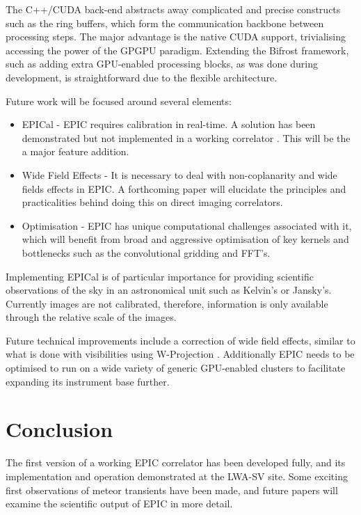 \documentclass[bibliography=totocnumbered, twocolumn]{article}
\begin{document}
The C++/CUDA back-end abstracts away complicated and precise constructs
such as the ring buffers, which form the communication backbone between
processing steps. The major advantage is the native CUDA support,
trivialising accessing the power of the GPGPU paradigm. Extending the 
Bifrost framework, such as adding extra GPU-enabled processing blocks, as
was done during development, is straightforward due to the flexible
architecture.

Future work will be focused around several elements:

\begin{itemize}
\item EPICal - EPIC requires calibration in real-time. A solution has been demonstrated but not implemented in a working correlator \citep{beardsley_efficient_2017}. This will be the a major feature addition.
\item Wide Field Effects - It is necessary to deal with non-coplanarity and wide fields effects in EPIC. A forthcoming paper will elucidate the principles and practicalities behind doing this on direct imaging correlators.
\item Optimisation - EPIC has unique computational challenges associated with it, which will benefit from broad and aggressive optimisation of key kernels and bottlenecks such as the convolutional gridding and FFT's.
\end{itemize}

Implementing EPICal is of particular importance for providing scientific
observations of the sky in an astronomical unit such as Kelvin's
or Jansky's. Currently images are not calibrated, therefore, information
is only available through the relative scale of the images.

Future technical improvements include a correction of wide field
effects, similar to what is done with visibilities using W-Projection \citep{cornwell_noncoplanar_2008}.
Additionally EPIC needs to be optimised to run on a wide variety of generic
GPU-enabled clusters to facilitate expanding its instrument base further.

\section{Conclusion}

The first version of a working EPIC correlator has been developed
fully, and its implementation and operation demonstrated at the
LWA-SV site. Some exciting first observations of meteor transients
have been made, and future papers will examine the scientific
output of EPIC in more detail.
\end{document}
